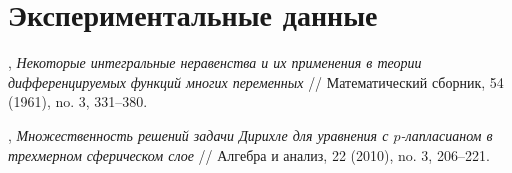 \documentclass{matmex-diploma-custom}
\theoremstyle{named}
\begin{document}
\section*{Экспериментальные данные}



\begin{thebibliography}{XXXX}
	{%
			\renewcommand{\baselinestretch}{1.01}
			\selectfont
			
			
	
		, {\em 
			Некоторые интегральные неравенства и их применения в теории дифференцируемых функций многих переменных
			} // Математический сборник, 54 (1961), no. 3, 331--380.
		
		, {\em Множественность решений задачи Дирихле для уравнения с $ p $-лапласианом в трехмерном сферическом слое} // Алгебра и анализ, 22 (2010), no. 3, 206--221.
			
	}%
\end{thebibliography}
	
\end{document}
